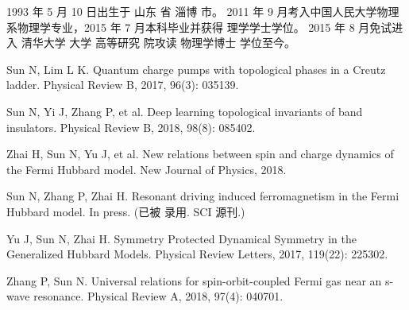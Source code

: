 \begin{resume}


    1993 年 5 月 10 日出生于 山东 省 淄博 市。
    2011 年 9 月考入中国人民大学物理系物理学专业，2015 年 7 月本科毕业并获得
    理学学士学位。
    2015 年 8 月免试进入 清华大学 大学 高等研究 院攻读 物理学博士 学位至今。


    \begin{publications}
        \item Sun N, Lim L K. Quantum charge pumps with topological phases in 
            a Creutz ladder. Physical Review B, 2017, 96(3): 035139.
        \item Sun N, Yi J, Zhang P, et al. Deep learning topological invariants 
            of band insulators. Physical Review B, 2018, 98(8): 085402.
        \item Zhai H, Sun N, Yu J, et al. New relations between spin and charge 
            dynamics of the Fermi Hubbard model. New Journal of Physics, 
            2018.
    \end{publications}

    \begin{publications}[before=\publicationskip,after=\publicationskip]
        \item Sun N, Zhang P, Zhai H. Resonant driving induced ferromagnetism 
            in the Fermi Hubbard model. In press. (已被 录用. SCI 源刊.)
    \end{publications}

    \begin{publications}
        \item Yu J, Sun N, Zhai H. Symmetry Protected Dynamical Symmetry in the 
            Generalized Hubbard Models. Physical Review Letters, 2017, 
            119(22): 225302.
        \item Zhang P, Sun N. Universal relations for spin-orbit-coupled Fermi 
            gas near an s-wave resonance. Physical Review A, 2018, 97(4): 
            040701.
    \end{publications}

\end{resume}
